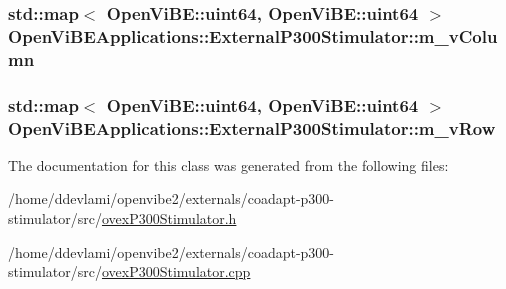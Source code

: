 \label{classOpenViBEApplications_1_1ExternalP300Stimulator_a4f8b4004855cf57ff8e0daabc17bc695}
\hypertarget{classOpenViBEApplications_1_1ExternalP300Stimulator_a17b4c52e142fdc53a88a323cb21835a9}{
\subsubsection[{m\_\-vColumn}]{\setlength{\rightskip}{0pt plus 5cm}std::map$<$ OpenViBE::uint64, OpenViBE::uint64 $>$ {\bf OpenViBEApplications::ExternalP300Stimulator::m\_\-vColumn}}}
\label{classOpenViBEApplications_1_1ExternalP300Stimulator_a17b4c52e142fdc53a88a323cb21835a9}
\hypertarget{classOpenViBEApplications_1_1ExternalP300Stimulator_a07d5caadf05e866a2b2c1612fc5e8b54}{
\subsubsection[{m\_\-vRow}]{\setlength{\rightskip}{0pt plus 5cm}std::map$<$ OpenViBE::uint64, OpenViBE::uint64 $>$ {\bf OpenViBEApplications::ExternalP300Stimulator::m\_\-vRow}}}
\label{classOpenViBEApplications_1_1ExternalP300Stimulator_a07d5caadf05e866a2b2c1612fc5e8b54}


The documentation for this class was generated from the following files:\begin{DoxyCompactItemize}
\item 
/home/ddevlami/openvibe2/externals/coadapt-\/p300-\/stimulator/src/\hyperlink{ovexP300Stimulator_8h}{ovexP300Stimulator.h}\item 
/home/ddevlami/openvibe2/externals/coadapt-\/p300-\/stimulator/src/\hyperlink{ovexP300Stimulator_8cpp}{ovexP300Stimulator.cpp}\end{DoxyCompactItemize}
